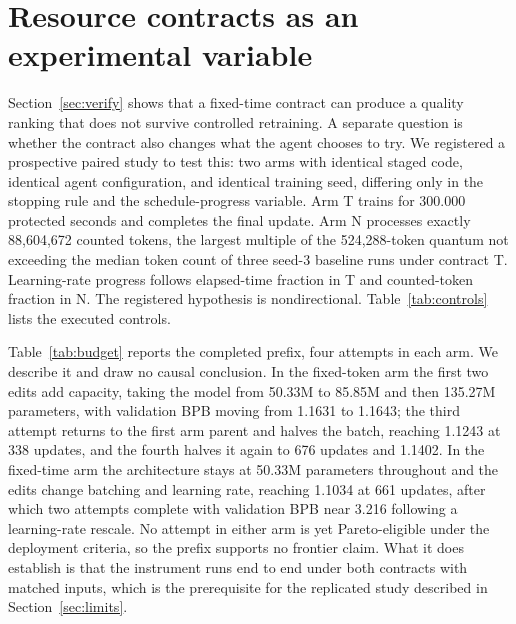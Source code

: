 \documentclass{article}
\begin{document}
\section{Resource contracts as an experimental variable}\label{sec:contract}
Section~\ref{sec:verify} shows that a fixed-time contract can produce a quality ranking that does not survive controlled retraining. A separate question is whether the contract also changes what the agent chooses to try. We registered a prospective paired study to test this: two arms with identical staged code, identical agent configuration, and identical training seed, differing only in the stopping rule and the schedule-progress variable. Arm T trains for 300.000 protected seconds and completes the final update. Arm N processes exactly 88,604,672 counted tokens, the largest multiple of the 524,288-token quantum not exceeding the median token count of three seed-3 baseline runs under contract T. Learning-rate progress follows elapsed-time fraction in T and counted-token fraction in N. The registered hypothesis is nondirectional. Table~\ref{tab:controls} lists the executed controls.

\begin{table}[t]
\caption{Executed controls for the paired budget study. The staged code, agent configuration, and training seed are shared; the stopping rule and the schedule-progress variable differ by design. Provider-side agent state is not observable.}\label{tab:controls}
\centering\small
\end{table}

\begin{table}[t]
\caption{Completed attempts in the paired budget study at the analysis freeze: four per arm. Each arm is a single adaptive trajectory in which every attempt may depend on its predecessors, so these are not eight independent samples and support no causal estimate.}\label{tab:budget}
\centering\small
\end{table}

Table~\ref{tab:budget} reports the completed prefix, four attempts in each arm. We describe it and draw no causal conclusion. In the fixed-token arm the first two edits add capacity, taking the model from 50.33M to 85.85M and then 135.27M parameters, with validation BPB moving from 1.1631 to 1.1643; the third attempt returns to the first arm parent and halves the batch, reaching 1.1243 at 338 updates, and the fourth halves it again to 676 updates and 1.1402. In the fixed-time arm the architecture stays at 50.33M parameters throughout and the edits change batching and learning rate, reaching 1.1034 at 661 updates, after which two attempts complete with validation BPB near 3.216 following a learning-rate rescale. No attempt in either arm is yet Pareto-eligible under the deployment criteria, so the prefix supports no frontier claim. What it does establish is that the instrument runs end to end under both contracts with matched inputs, which is the prerequisite for the replicated study described in Section~\ref{sec:limits}.
\end{document}
